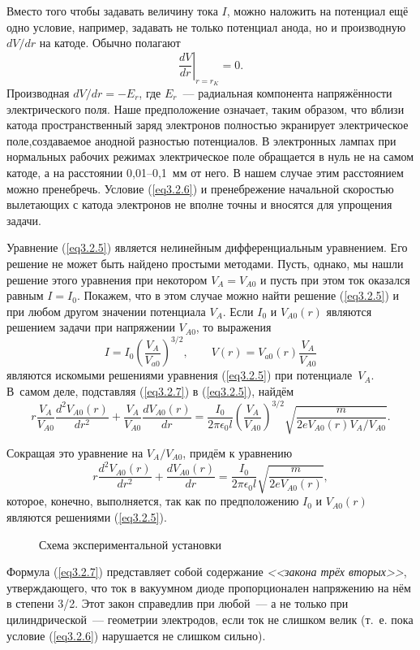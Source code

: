 Вместо того чтобы задавать величину тока $I$, можно наложить на потенциал ещё одно условие, например, задавать не только потенциал анода, но и производную $dV/dr$ на катоде. Обычно полагают
\begin{equation}
\left.\frac{dV}{dr}\right|_{r=r_K}=0.
\label{eq3.2.6}
\end{equation}
Производная $dV/dr=-E_r$, где $E_r$~--- радиальная компонента напряжённости электрического поля. Наше предположение
означает, таким образом, что вблизи катода пространственный заряд электронов полностью экранирует электрическое поле,создаваемое анодной разностью потенциалов. В электронных лампах при нормальных рабочих режимах электрическое поле обращается в нуль не на самом катоде, а на расстоянии 0,01--0,1~мм от него. В нашем случае этим расстоянием можно пренебречь. Условие (\ref{eq3.2.6}) и пренебрежение начальной скоростью вылетающих с катода электронов не вполне точны и вносятся для упрощения задачи.

Уравнение (\ref{eq3.2.5}) является нелинейным дифференциальным уравнением. Его решение не может быть найдено простыми методами. Пусть, однако, мы нашли решение этого уравнения при некотором $V_A=V_{A0}$ и пусть при этом ток оказался равным $I=I_0$. Покажем, что в этом случае можно найти решение (\ref{eq3.2.5}) и при любом другом значении потенциала $V_A$. Если $I_0$ и $V_{A0}(r)$ являются решением задачи при напряжении $V_{A0}$, то выражения
\begin{equation}
I=I_0\left(\frac{V_A}{V_{a0}}\right)^{3/2},\qquad V(r)=V_{a0}(r)\frac{V_A}{V_{A0}}
\label{eq3.2.8}
\end{equation}
являются искомыми решениями уравнения (\ref{eq3.2.5}) при потенциале~$V_A$. В~самом деле, подставляя (\ref{eq3.2.7}) в (\ref{eq3.2.5}), найдём
$$
r\frac{V_A}{V_{A0}} \frac{d^2V_{A0}(r)}{dr^2}+\frac{V_A}{V_{A0}} \frac{dV_{A0}(r)}{dr}=
\frac{I_0}{2\pi\epsilon_0l} \left( \frac{V_A}{V_{A0}} \right)^{3/2}
\sqrt{ \frac{m}{2eV_{A0}(r )V_A/V_{A0}}}.
$$

Сокращая это уравнение на $V_A/V_{A0}$, придём к уравнению
$$
r\frac{d^2V_{A0}(r)}{dr^2}+ \frac{dV_{A0}(r)}{dr}=\frac{I_0}{2\pi\epsilon_0l}\sqrt{\frac{m}{2eV_{A0}(r)}},
$$
которое, конечно, выполняется, так как по предположению $I_0$ и $V_{A0}(r)$ являются решениями (\ref{eq3.2.5}).

\begin{figure}
\caption{Схема экспериментальной установки}
\label{fig3.2.2}
\end{figure}

Формула (\ref{eq3.2.7}) представляет собой содержание {\em<<закона трёх вторых>>}, утверждающего, что ток в вакуумном диоде пропорционален напряжению на нём в степени 3/2. Этот закон справедлив при любой~--- а не только при цилиндрической~---
геометрии электродов, если ток не слишком велик (т.~е. пока условие (\ref{eq3.2.6}) нарушается не слишком сильно).

